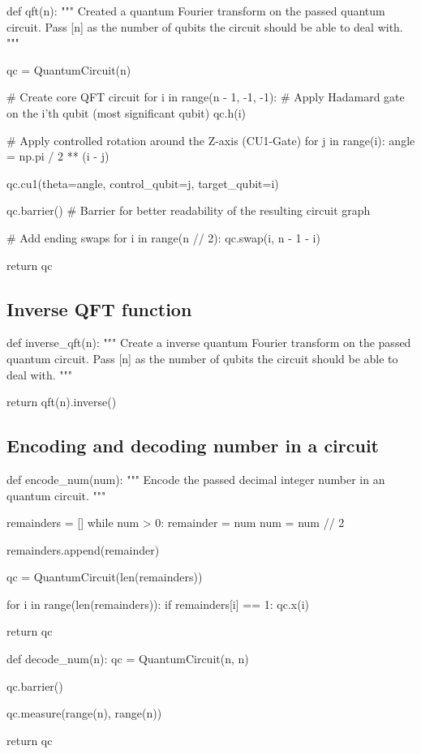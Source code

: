 \begin{python}
def qft(n):
    """
    Created a quantum Fourier transform on the passed quantum circuit.
    Pass [n] as the number of qubits the circuit should be able to deal with.
    """

    qc = QuantumCircuit(n)

    # Create core QFT circuit
    for i in range(n - 1, -1, -1):
        # Apply Hadamard gate on the i'th qubit (most significant qubit)
        qc.h(i)

    # Apply controlled rotation around the Z-axis (CU1-Gate)
    for j in range(i):
        angle = np.pi / 2 ** (i - j)

        qc.cu1(theta=angle, control_qubit=j, target_qubit=i)

        qc.barrier() # Barrier for better readability of the resulting circuit graph

    # Add ending swaps
    for i in range(n // 2):
        qc.swap(i, n - 1 - i)

    return qc
\end{python}

\subsection{Inverse QFT function}
\label{subsec:inverse-qft-function}

\begin{python}
def inverse_qft(n):
    """
    Create a inverse quantum Fourier transform on the passed quantum circuit.
    Pass [n] as the number of qubits the circuit should be able to deal with.
    """

    return qft(n).inverse()
\end{python}

\subsection{Encoding and decoding number in a circuit}
\label{subsec:encoding-decoding-number-in-circuit}

\begin{python}
def encode_num(num):
    """
    Encode the passed decimal integer number in an quantum circuit.
    """

    remainders = []
    while num > 0:
        remainder = num %
        num = num // 2

        remainders.append(remainder)

    qc = QuantumCircuit(len(remainders))

    for i in range(len(remainders)):
        if remainders[i] == 1:
            qc.x(i)

    return qc


def decode_num(n):
    qc = QuantumCircuit(n, n)

    qc.barrier()

    qc.measure(range(n), range(n))

    return qc
\end{python}

